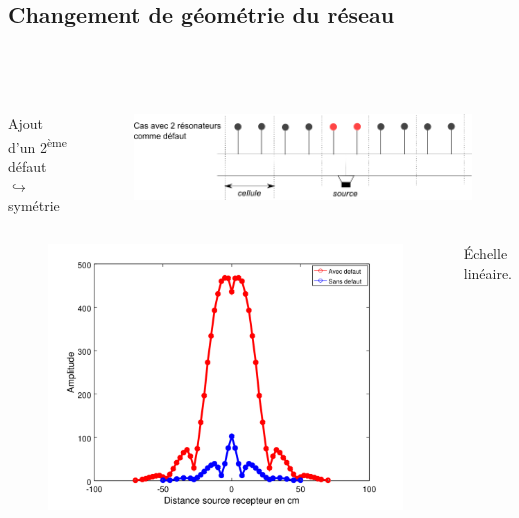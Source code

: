 \documentclass[12pt,xcolor=x11names,compress, notes=show]{beamer}%
\begin{document}
\subsection{Changement de géométrie du réseau}
\begin{frame}{\insertsectionhead}
\insertsubsectionhead\\~\\

\begin{columns}[T]
Ajout d'un 2\textsuperscript{ème} défaut \\ 
	\hspace{1cm} $\hookrightarrow$ symétrie
\vspace{-0.5cm}
\begin{figure}
\centering
\includegraphics[width= \textwidth]{chgmt_defaut2.png}
\end{figure}
\end{columns}

\vspace{-0.5cm}
\begin{columns}[T]
	\begin{figure}
		\centering
		\includegraphics[height=0.5\textheight]{comparaison_decroissance_lin.png}
	\end{figure}
	\centering
    \vspace{-0.2cm}	
	\footnotesize{Échelle linéaire.}
	

\end{columns}
\end{frame}
\end{document}
